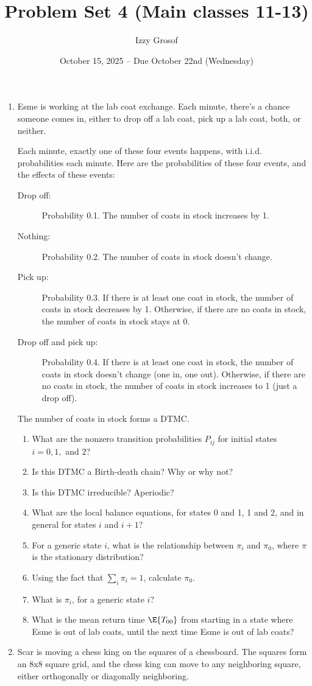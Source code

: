 \documentclass{article}
\title{Problem Set 4 (Main classes 11-13)}
\author{Izzy Grosof}
\date{October 15, 2025 -- Due October 22nd (Wednesday)}
\begin{document}
\maketitle

\begin{enumerate}
    \item Esme is working at the lab coat exchange.
    Each minute, there's a chance someone comes in, either to drop off a lab coat, pick up a lab coat, both, or neither.

    Each minute, exactly one of these four events happens, with i.i.d. probabilities each minute. Here are the probabilities of these four events, and the effects of these events:
    \begin{description}
        \item[Drop off:] Probability 0.1. The number of coats in stock increases by 1.
        \item[Nothing:] Probability 0.2. The number of coats in stock doesn't change.
        \item[Pick up:] Probability 0.3. If there is at least one coat in stock, the number of coats in stock decreases by 1. Otherwise, if there are no coats in stock, the number of coats in stock stays at 0.
        \item[Drop off and pick up:] Probability 0.4. If there is at least one coat in stock, the number of coats in stock doesn't change (one in, one out). Otherwise, if there are no coats in stock, the number of coats in stock increases to 1 (just a drop off).
    \end{description}

    The number of coats in stock forms a DTMC.
    \begin{enumerate}
        \item What are the nonzero transition probabilities $P_{ij}$
        for initial states $i=0, 1,$ and $2$?
        \item Is this DTMC a Birth-death chain? Why or why not?
        \item Is this DTMC irreducible? Aperiodic?
        \item What are the local balance equations, for states 0 and 1, 1 and 2, and in general for states $i$ and $i+1$?
        \item For a generic state $i$, what is the relationship between $\pi_i$ and $\pi_0$, where $\pi$ is the stationary distribution?
        \item Using the fact that $\sum_i \pi_i = 1$, calculate $\pi_0$.
        \item What is $\pi_i$, for a generic state $i$?
        \item What is the mean return time $\E{T_{00}}$ from starting in a state where Esme is out of lab coats, until the next time Esme is out of lab coats?
    \end{enumerate}
    \item Scar is moving a chess king on the squares of a chessboard. The squares form an 8x8 square grid, and the chess king can move to any neighboring square, either orthogonally or diagonally neighboring.


\end{enumerate}
\end{document}
